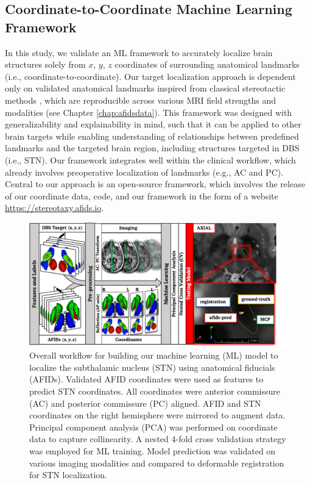 \subsection{Coordinate-to-Coordinate Machine Learning Framework}
In this study, we validate an ML framework to accurately localize brain structures solely from $x$, $y$, $z$ coordinates of surrounding anatomical landmarks (i.e., coordinate-to-coordinate). Our target localization approach is dependent only on validated anatomical landmarks inspired from classical stereotactic methods \cite{Lau2019-eh, Abbass2022-lf}, which are reproducible across various MRI field strengths and modalities (see Chapter \ref{chap:afidsdata}). This framework was designed with generalizability and explainability in mind, such that it can be applied to other brain targets while enabling understanding of relationships between predefined landmarks and the targeted brain region, including structures targeted in DBS (i.e., STN). Our framework integrates well within the clinical workflow, which already involves preoperative localization of landmarks (e.g., AC and PC). Central to our approach is an open-source framework, which involves the release of our coordinate data, code, and our framework in the form of a website \url{https://stereotaxy.afids.io}.

\begin{figure}[hbt!]
    \centering
    \includegraphics[width=0.9\linewidth]{figs/ch4_Figure_afidspred.png}
    \caption{Overall workflow for building our machine learning (ML) model to localize the subthalamic nucleus (STN) using anatomical fiducials (AFIDs). Validated AFID coordinates were used as features to predict STN coordinates. All coordinates were anterior commissure (AC) and posterior commissure (PC) aligned. AFID and STN coordinates on the right hemisphere were mirrored to augment data. Principal component analysis (PCA) was performed on coordinate data to capture collinearity. A nested 4-fold cross validation strategy was employed for ML training. Model prediction was validated on various imaging modalities and compared to deformable registration for STN localization.}
    \label{fig:ch4_Figure_afidspred}
\end{figure}

